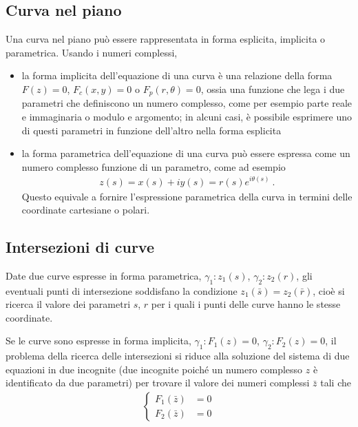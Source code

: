 \documentclass[letterpaper,10pt,italian]{jupyterBook}
\begin{document}
\subsection{Curva nel piano}
\label{\detokenize{ch/algebra/complex-algebra:curva-nel-piano}}
\sphinxAtStartPar
Una curva nel piano può essere rappresentata in forma esplicita, implicita o parametrica. Usando i numeri complessi,
\begin{itemize}
\item {} 
\sphinxAtStartPar
la forma implicita dell’equazione di una curva è una relazione della forma \(F(z)=0\), \(F_c(x, y) = 0\) o \(F_p(r, \theta) = 0\), ossia una funzione che lega i due parametri che definiscono un numero complesso, come per esempio parte reale e immaginaria o modulo e argomento; in alcuni casi, è possibile esprimere uno di questi parametri in funzione dell’altro nella forma esplicita

\item {} 
\sphinxAtStartPar
la forma parametrica dell’equazione di una curva può essere espressa come un numero complesso funzione di un parametro, come ad esempio
\begin{equation*}
\begin{split}z(s) = x(s) + i y(s) =  r(s) e^{i \theta(s)} \ .\end{split}
\end{equation*}
\sphinxAtStartPar
Questo equivale a fornire l’espressione parametrica della curva in termini delle coordinate cartesiane o polari.

\end{itemize}


\subsection{Intersezioni di curve}
\label{\detokenize{ch/algebra/complex-algebra:intersezioni-di-curve}}
\sphinxAtStartPar
Date due curve espresse in forma parametrica, \(\gamma_1: z_1(s)\), \(\gamma_2: z_2(r)\), gli eventuali punti di intersezione soddisfano la condizione \(z_1(\bar{s}) = z_2(\bar{r})\), cioè si ricerca il valore dei parametri \(s\), \(r\) per i quali i punti delle curve hanno le stesse coordinate.

\sphinxAtStartPar
Se le curve sono espresse in forma implicita, \(\gamma_1: F_1(z) = 0\), \(\gamma_2: F_2(z) = 0\), il problema della ricerca delle intersezioni si riduce alla soluzione del sistema di due equazioni in due incognite (due incognite poiché un numero complesso \(z\) è identificato da due parametri) per trovare il valore dei numeri complessi \(\bar{z}\) tali che
\begin{equation*}
\begin{split}\begin{cases} F_1(\bar{z}) & = 0 \\ F_2(\bar{z}) & = 0 \end{cases}\end{split}
\end{equation*}
\end{document}
